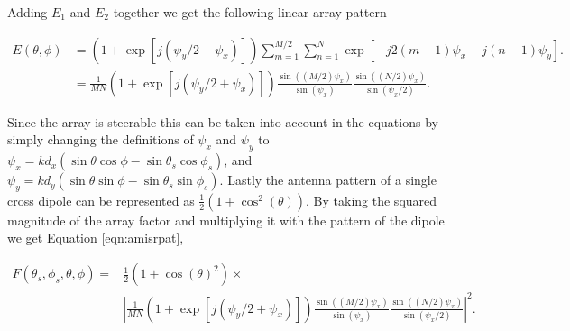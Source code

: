 \noindent Adding $E_1$ and $E_2$ together we get the following linear array pattern

\begin{equation} \label{eq1}
\begin{split}
E(\theta,\phi) &= \displaystyle  \left(1+ \exp\left[j(\psi_y/2 + \psi_x)\right]\right)\sum_{m=1}^{M/2}\sum_{n=1}^{N}  \exp\left[-j2\left(m-1\right) \psi_x -j\left(n-1\right) \psi_y\right].\\
& = \frac{1}{MN} \left(1+ \exp\left[j(\psi_y/2 + \psi_x)\right]\right)\frac{\sin((M/2) \psi_x)}{\sin(\psi_x)} \frac{\sin((N/2) \psi_x)}{\sin(\psi_x/2)}.
\end{split}
\end{equation}

Since the array is steerable this can be taken into account in the equations by simply changing the definitions of $\psi_x $ and $\psi_y$ to $\psi_x = k d_x(\sin\theta\cos\phi-\sin\theta_s\cos\phi_s)$, and $\psi_y = k d_y(\sin\theta\sin\phi-\sin\theta_s\sin\phi_s)$. Lastly the antenna pattern of a single cross dipole can be represented as $ \frac{1}{2}(1+\cos^2(\theta))$\cite{Balanis:2005:ATA:1208379}. By taking the squared magnitude of the array factor and multiplying it with the pattern of the dipole we get Equation \ref{eqn:amisrpat},

\begin{equation}
\label{eqn:amisrpatfinal}
\begin{split}
F(\theta_s,\phi_s,\theta,\phi) =& \frac{1}{2}(1+\cos(\theta)^2) \times \\& \left| \frac{1}{MN} \left(1+ \exp\left[j(\psi_y/2 + \psi_x)\right]\right)\frac{\sin((M/2) \psi_x)}{\sin(\psi_x)} \frac{\sin((N/2) \psi_x)}{\sin(\psi_x/2)}\right|^2.
\end{split}
\end{equation}